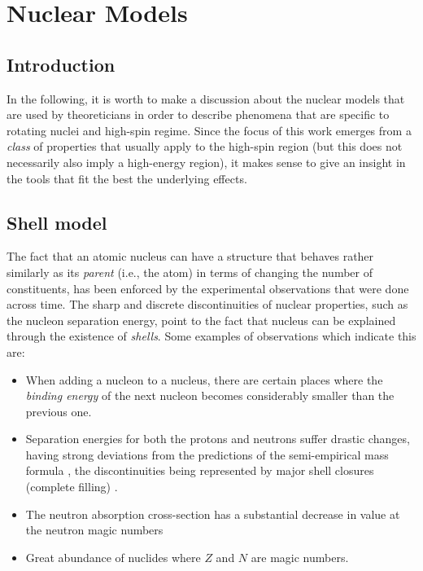 \chapter{Nuclear Models}

\section{Introduction}

In the following, it is worth to make a discussion about the nuclear models that are used by theoreticians in order to describe phenomena that are specific to rotating nuclei and high-spin regime. Since the focus of this work emerges from a \emph{class} of properties that usually apply to the high-spin region (but this does not necessarily also imply a high-energy region), it makes sense to give an insight in the tools that fit the best the underlying effects.

\section{Shell model}

The fact that an atomic nucleus can have a structure that behaves rather similarly as its \emph{parent} (i.e., the atom) in terms of changing the number of constituents, has been enforced by the experimental observations that were done across time. The sharp and discrete discontinuities of nuclear properties, such as the nucleon separation energy, point to the fact that nucleus can be explained through the existence of \emph{shells}. Some examples of observations which indicate this are:
\begin{itemize}
    \item When adding a nucleon to a nucleus, there are certain places where the \emph{binding energy} of the next nucleon becomes considerably smaller than the previous one. 
    \item Separation energies for both the protons and neutrons suffer drastic changes, having strong deviations from the predictions of the semi-empirical mass formula \cite{weizsacker1935theorie}, the discontinuities being represented by major shell closures (complete filling) \cite{krane1991introductory}.
    \item The neutron absorption cross-section has a substantial decrease in value at the neutron magic numbers
    \item Great abundance of nuclides where $Z$ and $N$ are magic numbers.
\end{itemize}


